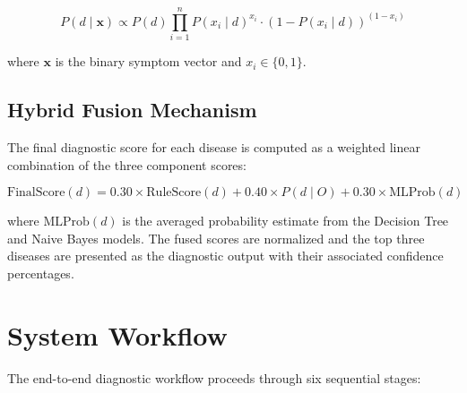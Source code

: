 \documentclass[12pt,a4paper]{article}
\begin{document}
\begin{equation}
    P(d \mid \mathbf{x}) \propto P(d) \prod_{i=1}^{n} P(x_i \mid d)^{x_i} \cdot (1 - P(x_i \mid d))^{(1 - x_i)}
\end{equation}

where $\mathbf{x}$ is the binary symptom vector and $x_i \in \{0, 1\}$.

\subsection{Hybrid Fusion Mechanism}

The final diagnostic score for each disease is computed as a weighted linear combination of the three component scores:

\begin{equation}
    \text{FinalScore}(d) = 0.30 \times \text{RuleScore}(d) + 0.40 \times P(d \mid O) + 0.30 \times \text{MLProb}(d)
\end{equation}

where $\text{MLProb}(d)$ is the averaged probability estimate from the Decision Tree and Naive Bayes models. The fused scores are normalized and the top three diseases are presented as the diagnostic output with their associated confidence percentages.

\section{System Workflow}

The end-to-end diagnostic workflow proceeds through six sequential stages:
\end{document}
